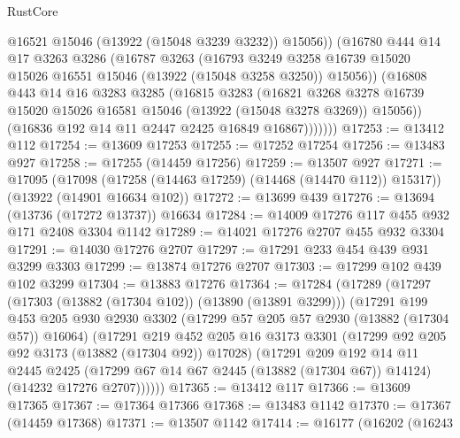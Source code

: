 \begin{lexlean}{RustCore}
\begin{coremodule}
                @16521
                @15046
                (@13922 (@15048 @3239 @3232))
                @15056))
            (@16780
              @444
              @14
              @17
              @3263
              @3286
              (@16787
                @3263
                (@16793
                  @3249
                  @3258
                  @16739
                  @15020
                  @15026
                  @16551
                  @15046
                  (@13922 (@15048 @3258 @3250))
                  @15056))
              (@16808
                @443
                @14
                @16
                @3283
                @3285
                (@16815
                  @3283
                  (@16821
                    @3268
                    @3278
                    @16739
                    @15020
                    @15026
                    @16581
                    @15046
                    (@13922 (@15048 @3278 @3269))
                    @15056))
                (@16836 @192 @14 @11 @2447 @2425 @16849 @16867)))))))
@17253 := @13412 @112
@17254 := @13609 @17253
@17255 := @17252 @17254
@17256 := @13483 @927
@17258 := @17255 (@14459 @17256)
@17259 := @13507 @927
@17271 := @17095
    (@17098 (@17258 (@14463 @17259) (@14468 (@14470 @112)) @15317))
    (@13922 (@14901 @16634 @102))
@17272 := @13699 @439
@17276 := @13694 (@13736 (@17272 @13737)) @16634
@17284 := @14009 @17276 @117 @455 @932 @171 @2408 @3304 @1142
@17289 := @14021 @17276 @2707 @455 @932 @3304
@17291 := @14030 @17276 @2707
@17297 := @17291 @233 @454 @439 @931 @3299 @3303
@17299 := @13874 @17276 @2707
@17303 := @17299 @102 @439 @102 @3299
@17304 := @13883 @17276
@17364 := @17284
    (@17289
      (@17297
        (@17303 (@13882 (@17304 @102)) (@13890 (@13891 @3299)))
        (@17291
          @199
          @453
          @205
          @930
          @2930
          @3302
          (@17299 @57 @205 @57 @2930 (@13882 (@17304 @57)) @16064)
          (@17291
            @219
            @452
            @205
            @16
            @3173
            @3301
            (@17299 @92 @205 @92 @3173 (@13882 (@17304 @92)) @17028)
            (@17291
              @209
              @192
              @14
              @11
              @2445
              @2425
              (@17299 @67 @14 @67 @2445 (@13882 (@17304 @67)) @14124)
              (@14232 @17276 @2707))))))
@17365 := @13412 @117
@17366 := @13609 @17365
@17367 := @17364 @17366
@17368 := @13483 @1142
@17370 := @17367 (@14459 @17368)
@17371 := @13507 @1142
@17414 := @16177
    (@16202
      (@16243

\end{coremodule}
\end{lexlean}
